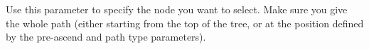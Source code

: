 
Use this parameter to specify the  node you want to select. Make sure you give the whole path (either starting from the top of the tree, or at the position defined by the pre-ascend and path type parameters).



